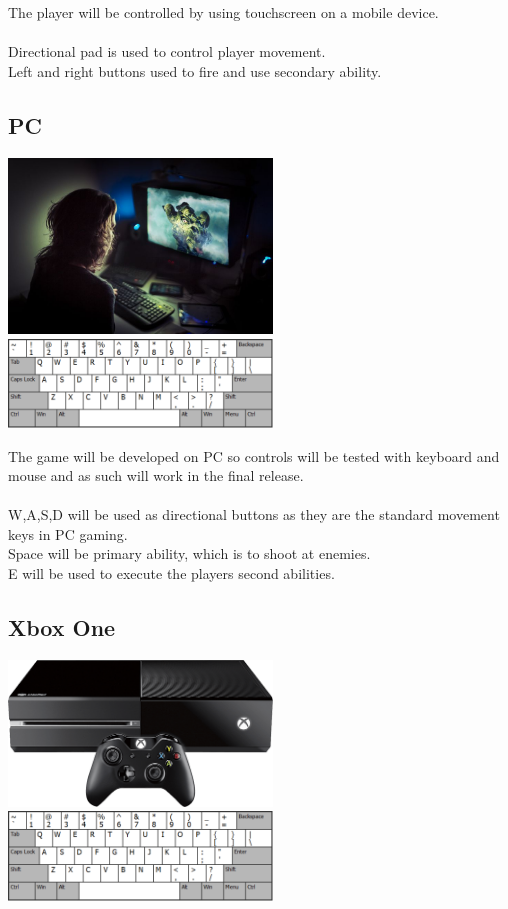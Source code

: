 \documentclass[a4paper]{scrreprt}
\begin{document}
The player will be controlled by using touchscreen on a mobile device. \\\\
Directional pad is used to control player movement.\\
Left and right buttons used to fire and use secondary ability.

\subsection{PC}

\begin{center}
\includegraphics[width=7cm]{pc-gaming}
\includegraphics[width=7cm]{pc-controls}
\end{center}

The game will be developed on PC so controls will be tested with keyboard and mouse and as such will work in the final release. \\\\
W,A,S,D will be used as directional buttons as they are the standard movement keys in PC gaming. \\
Space will be primary ability, which is to shoot at enemies. \\
E will be used to execute the players second abilities.

\subsection{Xbox One}

\begin{center}
\includegraphics[width=7cm]{Xbox-one}
\includegraphics[width=7cm]{pc-controls}
\end{center}
\end{document}
